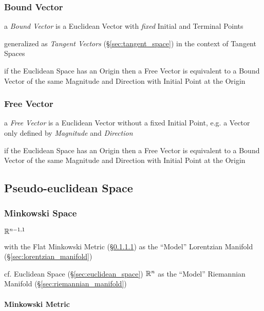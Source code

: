 \subsubsection{Bound Vector}\label{sec:bound_vector}

a \emph{Bound Vector} is a Euclidean Vector with \emph{fixed} Initial and
Terminal Points

generalized as \emph{Tangent Vectors} (\S\ref{sec:tangent_space}) in the
context of Tangent Spaces

if the Euclidean Space has an Origin then a Free Vector is equivalent to a
Bound Vector of the same Magnitude and Direction with Initial Point at the
Origin



\subsubsection{Free Vector}\label{sec:free_vector}

a \emph{Free Vector} is a Euclidean Vector without a fixed Initial Point, e.g.
a Vector only defined by \emph{Magnitude} and \emph{Direction}

if the Euclidean Space has an Origin then a Free Vector is equivalent to a
Bound Vector of the same Magnitude and Direction with Initial Point at the
Origin



\subsection{Pseudo-euclidean Space}\label{sec:pseudo_euclidean}

\subsubsection{Minkowski Space}\label{sec:minkowski_space}

$\mathbb{R}^{n-1,1}$

with the Flat Minkowski Metric (\S\ref{sec:minkowski_metric}) as the
``Model'' Lorentzian Manifold (\S\ref{sec:lorentzian_manifold})

cf. Euclidean Space (\S\ref{sec:euclidean_space}) $\mathbb{R}^n$ as the
``Model'' Riemannian Manifold (\S\ref{sec:riemannian_manifold})



\paragraph{Minkowski Metric}\label{sec:minkowski_metric}\hfill

